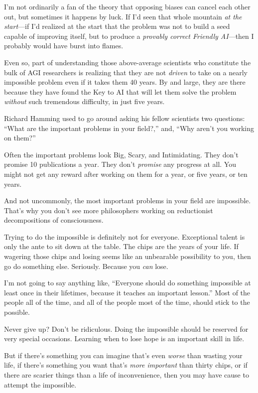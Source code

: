 {
 I'm not ordinarily a fan of the theory that
opposing biases can cancel each other out, but sometimes it happens by
luck. If I'd seen that whole mountain \textit{at the
start}{}---if I'd realized at the start that the
problem was not to build a seed capable of improving itself, but to
produce a \textit{provably correct Friendly AI}{}---then I probably
would have burst into flames.}

{
 Even so, part of understanding those above-average scientists who
constitute the bulk of AGI researchers is realizing that they are not
\textit{driven} to take on a nearly impossible problem even if it takes
them 40 years. By and large, they are there because they have found the
Key to AI that will let them solve the problem \textit{without} such
tremendous difficulty, in just five years.}

{
 Richard Hamming used to go around asking his fellow scientists two
questions: ``What are the important problems in your
field?,'' and, ``Why
aren't you working on them?''}

{
 Often the important problems look Big, Scary, and Intimidating.
They don't promise 10 publications a year. They
don't \textit{promise} any progress at all. You might
not get any reward after working on them for a year, or five years, or
ten years.}

{
 And not uncommonly, the most important problems in your field are
impossible. That's why you don't see
more philosophers working on reductionist decompositions of
consciousness.}

{
 Trying to do the impossible is definitely not for everyone.
Exceptional talent is only the ante to sit down at the table. The chips
are the years of your life. If wagering those chips and losing seems
like an unbearable possibility to you, then go do something else.
Seriously. Because you \textit{can} lose.}

{
 I'm not going to say anything like,
``Everyone should do something impossible at least
once in their lifetimes, because it teaches an important
lesson.'' Most of the people all of the time, and all
of the people most of the time, should stick to the possible.}

{
 Never give up? Don't be ridiculous. Doing the
impossible should be reserved for very special occasions. Learning when
to lose hope is an important skill in life.}

{
 But if there's something you can imagine
that's even \textit{worse} than wasting your life, if
there's something you want that's
\textit{more important} than thirty chips, or if there are scarier
things than a life of inconvenience, then you may have cause to attempt
the impossible.}


